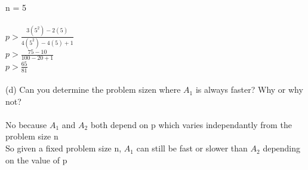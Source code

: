 \documentclass{article}
\begin{document}
    \indent n = 5\\\\
    \indent $p > \frac{3(5^2) - 2(5)}{4(5^2) - 4(5) + 1}$\\
    \indent $p > \frac{75 - 10}{100 - 20 + 1}$\\
    \indent $p > \frac{65}{81}$\\
    \\
    (d) Can you determine the problem sizen where $A_1$ is always faster? Why or why not?\\
    \\
    \indent No because $A_1$ and $A_2$ both depend on p which varies independantly from the problem size n\\
    \indent So given a fixed problem size n, $A_1$ can still be fast or slower than $A_2$ depending on the value of p\\
    \\
\end{document}
